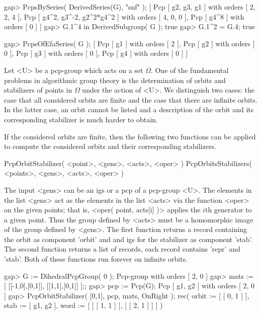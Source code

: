gap> PcpsBySeries( DerivedSeries(G), "snf" );
[ Pcp [ g2, g3, g1 ] with orders [ 2, 2, 4 ], 
  Pcp [ g4^2, g3^-2, g2^2*g4^2 ] with orders [ 4, 0, 0 ], 
  Pcp [ g4^8 ] with orders [ 0 ] ]
gap> G.1^4 in DerivedSubgroup( G );
true
gap> G.1^2 = G.4;                          
true

gap>  PcpsOfEfaSeries( G );
[ Pcp [ g1 ] with orders [ 2 ],
  Pcp [ g2 ] with orders [ 0 ],
  Pcp [ g3 ] with orders [ 0 ],
  Pcp [ g4 ] with orders [ 0 ] ]
\endexample


Let <U> be a pcp-group which acts on a set $\Omega$. One of the fundamental
problems in algorithmic group theory is the determination of orbits and 
stabilizers of points in $\Omega$ under the action of <U>. We distinguish
two cases: the case that all considered orbits are finite and the case that
there are infinite orbits. In the latter case, an orbit cannot be listed 
and a description of the orbit and its corresponding stabilizer is much 
harder to obtain.

If the considered orbits are finite, then the following two functions can be
applied to compute the considered orbits and their corresponding stabilizers.

\> PcpOrbitStabilizer( <point>, <gens>, <acts>, <oper> ) 
\> PcpOrbitsStabilizers( <points>, <gens>, <acts>, <oper> )

The input <gens> can be an igs or a pcp of a pcp-group <U>. The elements
in the list <gens> act as the elements in the list <acts> via the function
<oper> on the given points; that is, <oper( point, acts[i] )> applies the
$i$th generator to a given point. Thus the group defined by <acts> must be
a homomorphic image of the group defined by <gens>. The first function 
returns a record containing the orbit as component 'orbit' and and igs for 
the stabilizer as component 'stab'. The second function returns a list of 
records, each record contains 'repr' and 'stab'. Both of these functions 
run forever on infinite orbits.

\beginexample
gap> G := DihedralPcpGroup( 0 );
Pcp-group with orders [ 2, 0 ]
gap> mats := [ [[-1,0],[0,1]], [[1,1],[0,1]] ];;
gap> pcp := Pcp(G);
Pcp [ g1, g2 ] with orders [ 2, 0 ]
gap> PcpOrbitStabilizer( [0,1], pcp, mats, OnRight );
rec( orbit := [ [ 0, 1 ] ],
     stab := [ g1, g2 ],
     word := [ [ [ 1, 1 ] ], [ [ 2, 1 ] ] ] )
\endexample

